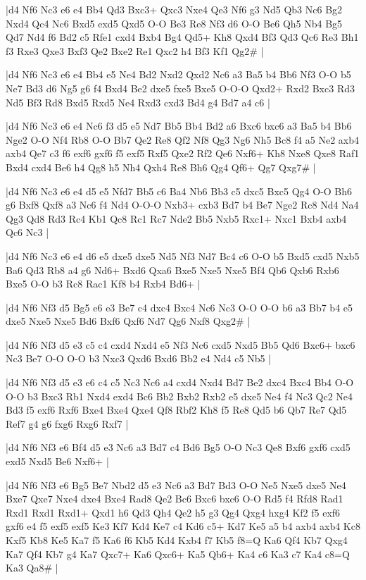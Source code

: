 \whitename{}
\blackname{}
\makegametitle
|d4 Nf6 Nc3 e6 e4 Bb4 Qd3 Bxc3+ Qxc3 Nxe4 Qe3 Nf6 g3 Nd5 Qb3 Nc6 Bg2 Nxd4 Qc4 Nc6 Bxd5 exd5 Qxd5 O-O Be3 Re8 Nf3 d6 O-O Be6 Qh5 Nb4 Bg5 Qd7 Nd4 f6 Bd2 c5 Rfe1 cxd4 Bxb4 Bg4 Qd5+ Kh8 Qxd4 Bf3 Qd3 Qc6 Re3 Bh1 f3 Rxe3 Qxe3 Bxf3 Qe2 Bxe2 Re1 Qxc2 h4 Bf3 Kf1 Qg2\#  |

\whitename{}
\blackname{}
\makegametitle
|d4 Nf6 Nc3 e6 e4 Bb4 e5 Ne4 Bd2 Nxd2 Qxd2 Nc6 a3 Ba5 b4 Bb6 Nf3 O-O b5 Ne7 Bd3 d6 Ng5 g6 f4 Bxd4 Be2 dxe5 fxe5 Bxe5 O-O-O Qxd2+ Rxd2 Bxc3 Rd3 Nd5 Bf3 Rd8 Bxd5 Rxd5 Ne4 Rxd3 cxd3 Bd4 g4 Bd7 a4 c6  |

\whitename{}
\blackname{}
\makegametitle
|d4 Nf6 Nc3 e6 e4 Nc6 f3 d5 e5 Nd7 Bb5 Bb4 Bd2 a6 Bxc6 bxc6 a3 Ba5 b4 Bb6 Nge2 O-O Nf4 Rb8 O-O Bb7 Qe2 Re8 Qf2 Nf8 Qg3 Ng6 Nh5 Bc8 f4 a5 Ne2 axb4 axb4 Qe7 c3 f6 exf6 gxf6 f5 exf5 Rxf5 Qxe2 Rf2 Qe6 Nxf6+ Kh8 Nxe8 Qxe8 Raf1 Bxd4 cxd4 Be6 h4 Qg8 h5 Nh4 Qxh4 Re8 Bh6 Qg4 Qf6+ Qg7 Qxg7\#  |

\whitename{}
\blackname{}
\makegametitle
|d4 Nf6 Nc3 e6 e4 d5 e5 Nfd7 Bb5 c6 Ba4 Nb6 Bb3 c5 dxc5 Bxc5 Qg4 O-O Bh6 g6 Bxf8 Qxf8 a3 Nc6 f4 Nd4 O-O-O Nxb3+ cxb3 Bd7 b4 Be7 Nge2 Rc8 Nd4 Na4 Qg3 Qd8 Rd3 Rc4 Kb1 Qc8 Rc1 Rc7 Nde2 Bb5 Nxb5 Rxc1+ Nxc1 Bxb4 axb4 Qc6 Nc3  |

\whitename{}
\blackname{}
\makegametitle
|d4 Nf6 Nc3 e6 e4 d6 e5 dxe5 dxe5 Nd5 Nf3 Nd7 Bc4 c6 O-O b5 Bxd5 cxd5 Nxb5 Ba6 Qd3 Rb8 a4 g6 Nd6+ Bxd6 Qxa6 Bxe5 Nxe5 Nxe5 Bf4 Qb6 Qxb6 Rxb6 Bxe5 O-O b3 Rc8 Rac1 Kf8 b4 Rxb4 Bd6+  |

\whitename{}
\blackname{}
\makegametitle
|d4 Nf6 Nf3 d5 Bg5 e6 e3 Be7 c4 dxc4 Bxc4 Nc6 Nc3 O-O O-O b6 a3 Bb7 b4 e5 dxe5 Nxe5 Nxe5 Bd6 Bxf6 Qxf6 Nd7 Qg6 Nxf8 Qxg2\#  |

\whitename{}
\blackname{}
\makegametitle
|d4 Nf6 Nf3 d5 e3 c5 c4 cxd4 Nxd4 e5 Nf3 Nc6 cxd5 Nxd5 Bb5 Qd6 Bxc6+ bxc6 Nc3 Be7 O-O O-O b3 Nxc3 Qxd6 Bxd6 Bb2 e4 Nd4 c5 Nb5  |

\whitename{}
\blackname{}
\makegametitle
|d4 Nf6 Nf3 d5 e3 e6 c4 c5 Nc3 Nc6 a4 cxd4 Nxd4 Bd7 Be2 dxc4 Bxc4 Bb4 O-O O-O b3 Bxc3 Rb1 Nxd4 exd4 Bc6 Bb2 Bxb2 Rxb2 e5 dxe5 Ne4 f4 Nc3 Qc2 Ne4 Bd3 f5 exf6 Rxf6 Bxe4 Bxe4 Qxe4 Qf8 Rbf2 Kh8 f5 Re8 Qd5 b6 Qb7 Re7 Qd5 Ref7 g4 g6 fxg6 Rxg6 Rxf7  |

\whitename{}
\blackname{}
\makegametitle
|d4 Nf6 Nf3 e6 Bf4 d5 e3 Nc6 a3 Bd7 c4 Bd6 Bg5 O-O Nc3 Qe8 Bxf6 gxf6 cxd5 exd5 Nxd5 Be6 Nxf6+  |

\whitename{}
\blackname{}
\makegametitle
|d4 Nf6 Nf3 e6 Bg5 Be7 Nbd2 d5 e3 Nc6 a3 Bd7 Bd3 O-O Ne5 Nxe5 dxe5 Ne4 Bxe7 Qxe7 Nxe4 dxe4 Bxe4 Rad8 Qe2 Bc6 Bxc6 bxc6 O-O Rd5 f4 Rfd8 Rad1 Rxd1 Rxd1 Rxd1+ Qxd1 h6 Qd3 Qh4 Qe2 h5 g3 Qg4 Qxg4 hxg4 Kf2 f5 exf6 gxf6 e4 f5 exf5 exf5 Ke3 Kf7 Kd4 Ke7 c4 Kd6 c5+ Kd7 Ke5 a5 b4 axb4 axb4 Kc8 Kxf5 Kb8 Ke5 Ka7 f5 Ka6 f6 Kb5 Kd4 Kxb4 f7 Kb5 f8=Q Ka6 Qf4 Kb7 Qxg4 Ka7 Qf4 Kb7 g4 Ka7 Qxc7+ Ka6 Qxc6+ Ka5 Qb6+ Ka4 c6 Ka3 c7 Ka4 c8=Q Ka3 Qa8\#  |

